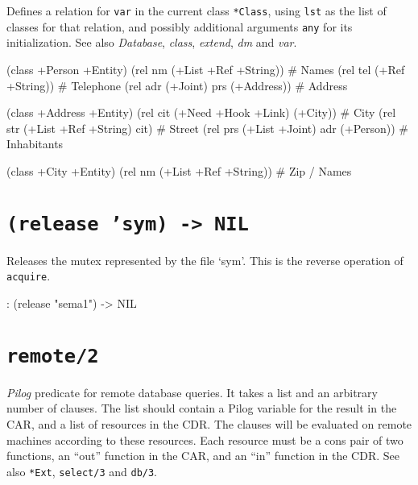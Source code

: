 Defines a relation for \texttt{var} in the current class \texttt{*Class}, using \texttt{lst}
as the list of classes for that relation, and possibly additional
arguments \texttt{any} for its initialization. See also
\emph{Database}, \emph{class},
\emph{extend}, \emph{dm} and
\emph{var}.


\begin{wideverbatim}
(class +Person +Entity)
(rel nm  (+List +Ref +String))            # Names
(rel tel (+Ref +String))                  # Telephone
(rel adr (+Joint) prs (+Address))         # Address

(class +Address +Entity)
(rel cit (+Need +Hook +Link) (+City))     # City
(rel str (+List +Ref +String) cit)        # Street
(rel prs (+List +Joint) adr (+Person))    # Inhabitants

(class +City +Entity)
(rel nm  (+List +Ref +String))            # Zip / Names
\end{wideverbatim}

 
\section*{\texttt{(release 'sym) -> NIL}}
\label{sec:func-ref-R-(release 'sym) -> NIL}


Releases the mutex represented by the file `sym'. This is the reverse
operation of \texttt{acquire}.


\begin{wideverbatim}
: (release "sema1")
-> NIL
\end{wideverbatim}

 
\section*{\texttt{remote/2}}
\label{sec:func-ref-R-remote/2}


\emph{Pilog} predicate for remote database queries. It
takes a list and an arbitrary number of clauses. The list should contain
a Pilog variable for the result in the CAR, and a list of resources in
the CDR. The clauses will be evaluated on remote machines according to
these resources. Each resource must be a cons pair of two functions, an
``out'' function in the CAR, and an ``in'' function in the CDR. See also
\texttt{*Ext}, \texttt{select/3} and \texttt{db/3}.



